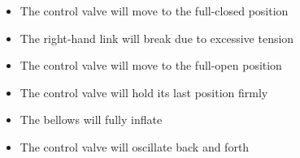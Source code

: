 \begin{itemize}
\item{} The control valve will move to the full-closed position 
\vskip 5pt 
\item{} The right-hand link will break due to excessive tension
\vskip 5pt 
\item{} The control valve will move to the full-open position
\vskip 5pt 
\item{} The control valve will hold its last position firmly
\vskip 5pt 
\item{} The bellows will fully inflate
\vskip 5pt 
\item{} The control valve will oscillate back and forth 
\end{itemize}





